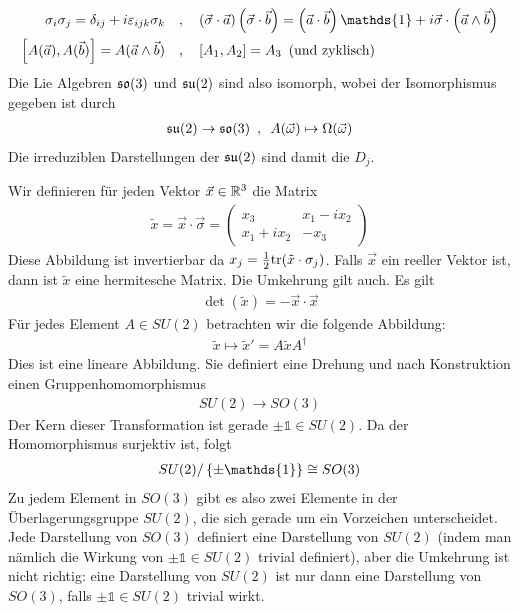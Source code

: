 \begin{align*}
    \sigma_i \sigma_j = \delta_{ij} + i \epsilon_{ijk} \sigma_k
    \hspace{10pt} &, \hspace{10pt}
    \klammer{\vec{\sigma} \cdot \vec{a}} \klammer{\vec{\sigma} \cdot \vec{b}}
    = \klammer{\vec{a} \cdot \vec{b}} \mathds{1} + i \vec{\sigma} \cdot \klammer{\vec{a} \wedge \vec{b}}
    \\
    \eckigeklammer{A(\vec{a}) , A(\vec{b})} = A(\vec{a} \wedge \vec{b})
    \hspace{10pt} &, \hspace{10pt}
    [A_1 , A_2] = A_3 \hspace{5pt} \text{(und zyklisch)}
\end{align*}
Die Lie Algebren $\mathfrak{so}(3)$ und $\mathfrak{su}(2)$ sind also isomorph, wobei der Isomorphismus
gegeben ist durch
\begin{align*}
    \mathfrak{su}(2) \rightarrow \mathfrak{so}(3)
    \hspace{5pt} , \hspace{5pt}
    A(\vec{\omega}) \mapsto \Omega(\vec{\omega})
\end{align*}
Die irreduziblen Darstellungen der $\mathfrak{su}(2)$ sind damit die $D_j$.

Wir definieren für jeden Vektor $\vec{x} \in \mathbb{R}^3$ die Matrix
\begin{align*}
    \tilde{x} = \vec{x} \cdot \vec{\sigma} = \begin{pmatrix}
        x_3 & x_1 - i x_2 \\ x_1 + i x_2 & -x_3
    \end{pmatrix}
\end{align*}
Diese Abbildung ist invertierbar da $x_j = \frac{1}{2} \text{tr}(\tilde{x} \cdot \sigma_j)$.
Falls $\vec{x}$ ein reeller Vektor ist, dann ist $\tilde{x}$ eine hermitesche Matrix.
Die Umkehrung gilt auch. Es gilt
\begin{align*}
    \det(\tilde{x}) = - \vec{x} \cdot \vec{x}
\end{align*}
Für jedes Element $A \in SU(2)$ betrachten wir die folgende Abbildung:
\begin{align*}
    \tilde{x} \mapsto \tilde{x}' = A \tilde{x} A^\dagger
\end{align*}
Dies ist eine lineare Abbildung. Sie definiert eine Drehung und nach
Konstruktion einen Gruppenhomomorphismus
\begin{align*}
    SU(2) \rightarrow SO(3)
\end{align*}
Der Kern dieser Transformation ist gerade $\pm \mathds{1} \in SU(2)$.
Da der Homomorphismus surjektiv ist, folgt
\begin{align*}
    SU(2) / \geschwungeneklammer{\pm \mathds{1}} \cong SO(3)
\end{align*}
Zu jedem Element in $SO(3)$ gibt es also zwei Elemente in der Überlagerungsgruppe
$SU(2)$, die sich gerade um ein Vorzeichen unterscheidet. Jede Darstellung von
$SO(3)$ definiert eine Darstellung von $SU(2)$ (indem man nämlich die Wirkung
von $\pm \mathds{1} \in SU(2)$ trivial definiert), aber die Umkehrung ist nicht
richtig: eine Darstellung von $SU(2)$ ist nur dann eine Darstellung von $SO(3)$,
falls $\pm \mathds{1} \in SU(2)$ trivial wirkt.


